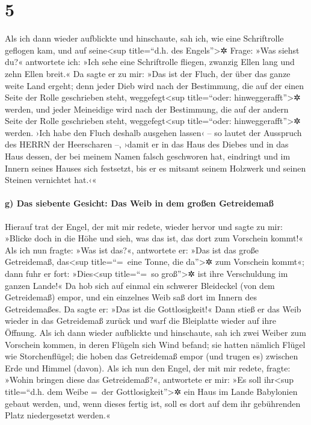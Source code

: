 \hypertarget{section-4}{%
\section{5}\label{section-4}}

 Als ich dann wieder aufblickte und hinschaute, sah ich,
wie eine Schriftrolle geflogen kam,  und auf
seine\textless sup title=``d.h. des Engels''\textgreater✲ Frage: »Was
siehst du?« antwortete ich: »Ich sehe eine Schriftrolle fliegen, zwanzig
Ellen lang und zehn Ellen breit.«  Da sagte er zu mir:
»Das ist der Fluch, der über das ganze weite Land ergeht; denn jeder
Dieb wird nach der Bestimmung, die auf der einen Seite der Rolle
geschrieben steht, weggefegt\textless sup title=``oder:
hinweggerafft''\textgreater✲ werden, und jeder Meineidige wird nach der
Bestimmung, die auf der andern Seite der Rolle geschrieben steht,
weggefegt\textless sup title=``oder: hinweggerafft''\textgreater✲
werden.  ›Ich habe den Fluch deshalb ausgehen lassen‹ --
so lautet der Ausspruch des HERRN der Heerscharen --, ›damit er in das
Haus des Diebes und in das Haus dessen, der bei meinem Namen falsch
geschworen hat, eindringt und im Innern seines Hauses sich festsetzt,
bis er es mitsamt seinem Holzwerk und seinen Steinen vernichtet hat.‹«

\hypertarget{g-das-siebente-gesicht-das-weib-in-dem-grouxdfen-getreidemauxdf}{%
\paragraph{g) Das siebente Gesicht: Das Weib in dem großen
Getreidemaß}\label{g-das-siebente-gesicht-das-weib-in-dem-grouxdfen-getreidemauxdf}}

 Hierauf trat der Engel, der mit mir redete, wieder hervor
und sagte zu mir: »Blicke doch in die Höhe und sieh, was das ist, das
dort zum Vorschein kommt!«  Als ich nun fragte: »Was ist
das?«, antwortete er: »Das ist das große Getreidemaß, das\textless sup
title=``=~eine Tonne, die da''\textgreater✲ zum Vorschein kommt«; dann
fuhr er fort: »Dies\textless sup title=``=~so groß''\textgreater✲ ist
ihre Verschuldung im ganzen Lande!«  Da hob sich auf
einmal ein schwerer Bleideckel (von dem Getreidemaß) empor, und ein
einzelnes Weib saß dort im Innern des Getreidemaßes.  Da
sagte er: »Das ist die Gottlosigkeit!« Dann stieß er das Weib wieder in
das Getreidemaß zurück und warf die Bleiplatte wieder auf ihre Öffnung.
 Als ich dann wieder aufblickte und hinschaute, sah ich
zwei Weiber zum Vorschein kommen, in deren Flügeln sich Wind befand; sie
hatten nämlich Flügel wie Storchenflügel; die hoben das Getreidemaß
empor (und trugen es) zwischen Erde und Himmel (davon). 
Als ich nun den Engel, der mit mir redete, fragte: »Wohin bringen diese
das Getreidemaß?«,  antwortete er mir: »Es soll
ihr\textless sup title=``d.h. dem Weibe =~der
Gottlosigkeit''\textgreater✲ ein Haus im Lande Babylonien gebaut werden,
und, wenn dieses fertig ist, soll es dort auf dem ihr gebührenden Platz
niedergesetzt werden.«

